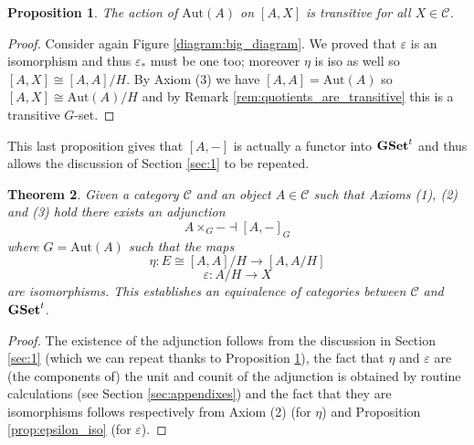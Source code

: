 \documentclass[italian, 12pt, reqno]{article}
\theoremstyle{myteo}
\newtheorem{theorem}{Theorem}[section]
\newtheorem{proposition}[theorem]{Proposition}
\numberwithin{equation}{section}
\newcommand{\cat}[1]{\mathscr{#1}}
\newcommand{\tgset}{\text{\textbf{GSet}}^t}
\newcommand{\homs}[2]{[#1, #2]}
\newcommand{\fun}[3]{#1\colon#2\to #3}
\begin{document}
\begin{proposition}
  \label{prop:transitive_action}
  The action of \(\text{Aut}(A)\) on \(\homs{A}{X}\) is transitive for all \(X\in\cat{C}\).
\end{proposition}

\begin{proof}
  Consider again Figure \ref{diagram:big_diagram}.
  We proved that \(\varepsilon\) is an isomorphism and thus \(\varepsilon_*\) must be one too; moreover \(\eta\) is iso as well so \([A, X] \cong [A, A]/H\).
  By Axiom (3) we have \([A, A] = \text{Aut}(A)\) so \([A, X] \cong \text{Aut}(A)/H\) and by Remark \ref{rem:quotients_are_transitive} this is a transitive \(G\)-set.
\end{proof}

This last proposition gives that \([A, -]\) is actually a functor into \(\tgset\) and thus allows the discussion of Section \ref{sec:1} to be repeated.

\begin{theorem}
  \label{theo:galois}
  Given a category \(\cat{C}\) and an object \(A\in\cat{C}\) such that Axioms (1), (2) and (3) hold there exists an adjunction
  \[A\times_G- \dashv \homs{A}{-}_G\]
  where \(G = \text{Aut}(A)\) such that the maps
  \[\fun{\eta}{E\cong \homs{A}{A}/H}{\homs{A}{A/H}}\]
  \[\fun{\varepsilon}{A/H}{X}\]
  are isomorphisms.
  This establishes an equivalence of categories between \(\cat{C}\) and \(\tgset\).
\end{theorem}

\begin{proof}
  The existence of the adjunction follows from the discussion in Section \ref{sec:1} (which we can repeat thanks to Proposition \ref{prop:transitive_action}), the fact that \(\eta\) and \(\varepsilon\) are (the components of) the unit and counit of the adjunction is obtained by routine calculations (see Section \ref{sec:appendixes}) and the fact that they are isomorphisms follows respectively from Axiom (2) (for \(\eta\)) and Proposition \ref{prop:epsilon_iso} (for \(\varepsilon\)).
\end{proof}
\end{document}
